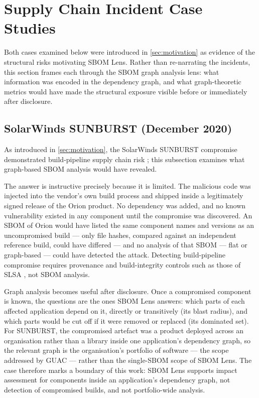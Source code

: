 \section{Supply Chain Incident Case Studies}
\label{sec:case-studies}

Both cases examined below were introduced in \autoref{sec:motivation} as evidence of the structural risks motivating SBOM Lens. Rather than re-narrating the incidents, this section frames each through the SBOM graph analysis lens: what information was encoded in the dependency graph, and what graph-theoretic metrics would have made the structural exposure visible before or immediately after disclosure.


\subsection{SolarWinds SUNBURST (December 2020)}
\label{sec:case-solarwinds}

As introduced in \autoref{sec:motivation}, the SolarWinds SUNBURST compromise demonstrated build-pipeline supply chain risk \citep{CISA_AA20_352A}; this subsection examines what graph-based SBOM analysis would have revealed.

The answer is instructive precisely because it is limited. The malicious code was injected into the vendor's own build process and shipped inside a legitimately signed release of the Orion product. No dependency was added, and no known vulnerability existed in any component until the compromise was discovered. An SBOM of Orion would have listed the same component names and versions as an uncompromised build --- only file hashes, compared against an independent reference build, could have differed --- and no analysis of that SBOM --- flat or graph-based --- could have detected the attack. Detecting build-pipeline compromise requires provenance and build-integrity controls such as those of SLSA \citep{SLSA}, not SBOM analysis.

Graph analysis becomes useful after disclosure. Once a compromised component is known, the questions are the ones SBOM Lens answers: which parts of each affected application depend on it, directly or transitively (its blast radius), and which parts would be cut off if it were removed or replaced (its dominated set). For SUNBURST, the compromised artefact was a product deployed across an organisation rather than a library inside one application's dependency graph, so the relevant graph is the organisation's portfolio of software --- the scope addressed by GUAC \citep{GUAC2024} --- rather than the single-SBOM scope of SBOM Lens. The case therefore marks a boundary of this work: SBOM Lens supports impact assessment for components inside an application's dependency graph, not detection of compromised builds, and not portfolio-wide analysis.


